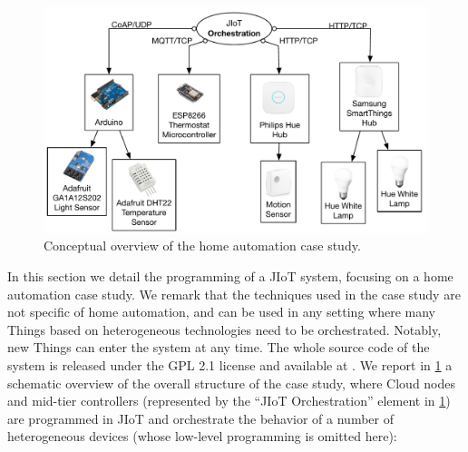 \begin{figure}[t]
  \centering
  \includegraphics[width=\textwidth]{case_study_overview.pdf}
  \caption{Conceptual overview of the home automation case study.}
  \label{fig:case_study_overview} \end{figure}

In this section we detail the programming of a JIoT system, focusing on a home
automation case study. We remark that the techniques used in the case study
are not specific of home automation, and can be used in any setting where many
Things based on heterogeneous technologies need to be orchestrated. Notably,
new Things can enter the system at any time. The whole source code of the
system is released under the GPL 2.1
license and available at \cite{jiot}. We
report in \cref{fig:case_study_overview} a schematic overview of the overall
structure of the case study, where Cloud nodes and mid-tier controllers
(represented by the ``JIoT Orchestration'' element in
\cref{fig:case_study_overview}) are programmed in JIoT and orchestrate the
behavior of a number of heterogeneous devices (whose low-level programming is
omitted here): 

